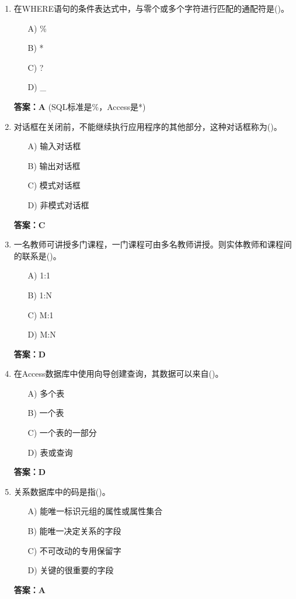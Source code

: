 \documentclass[a4paper,12pt]{article}
\begin{document}
\begin{enumerate}[label=\arabic*.]
\item 在WHERE语句的条件表达式中，与零个或多个字符进行匹配的通配符是()。
\begin{itemize}
    \item[A)] \%
    \item[B)] *
    \item[C)] ?
    \item[D)] \_
\end{itemize}
\textbf{答案：A} (SQL标准是\%，Access是*)

\item 对话框在关闭前，不能继续执行应用程序的其他部分，这种对话框称为()。
\begin{itemize}
    \item[A)] 输入对话框
    \item[B)] 输出对话框
    \item[C)] 模式对话框
    \item[D)] 非模式对话框
\end{itemize}
\textbf{答案：C}

\item 一名教师可讲授多门课程，一门课程可由多名教师讲授。则实体教师和课程间的联系是()。
\begin{itemize}
    \item[A)] 1:1
    \item[B)] 1:N
    \item[C)] M:1
    \item[D)] M:N
\end{itemize}
\textbf{答案：D}

\item 在Access数据库中使用向导创建查询，其数据可以来自()。
\begin{itemize}
    \item[A)] 多个表
    \item[B)] 一个表
    \item[C)] 一个表的一部分
    \item[D)] 表或查询
\end{itemize}
\textbf{答案：D}

\item 关系数据库中的码是指()。
\begin{itemize}
    \item[A)] 能唯一标识元组的属性或属性集合
    \item[B)] 能唯一决定关系的字段
    \item[C)] 不可改动的专用保留字
    \item[D)] 关键的很重要的字段
\end{itemize}
\textbf{答案：A}


\end{enumerate}
\end{document}
